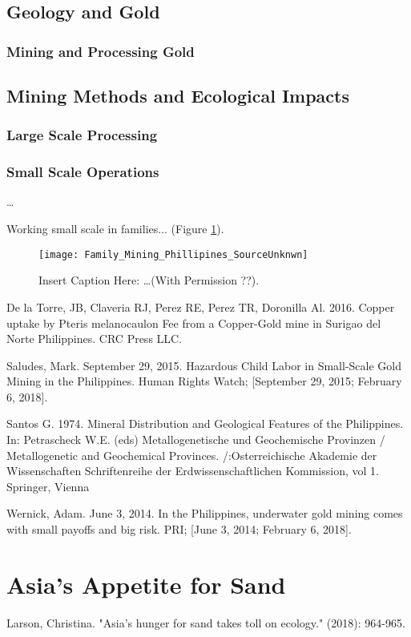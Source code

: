 \subsection{Geology and Gold}

\subsubsection{Mining and Processing Gold}

\subsection{Mining Methods and Ecological Impacts}

\subsubsection{Large Scale Processing}

\subsubsection{Small Scale Operations}

\citet{drasch2001mt} \ldots

Working small scale in families... (Figure \ref{fig:famliymining}).

\begin{figure}[!ht]
\texttt{[image: Family\_Mining\_Phillipines\_SourceUnknwn]}

\caption{Insert Caption Here: \ldots (With Permission ??).}
\label{fig:famliymining}
\end{figure}

\citep{de2016copper}

De la Torre, JB, Claveria RJ, Perez RE, Perez TR, Doronilla Al. 2016. Copper uptake by Pteris melanocaulon Fee from a Copper-Gold mine in Surigao del Norte Philippines. CRC Press LLC. 

Saludes, Mark. September 29, 2015. Hazardous Child Labor in Small-Scale Gold Mining in the Philippines. Human Rights Watch; [September 29, 2015; February 6, 2018].

\citet{santos1974mineral}

Santos G. 1974. Mineral Distribution and Geological Features of the Philippines. In: Petrascheck W.E. (eds) Metallogenetische und Geochemische Provinzen / Metallogenetic and Geochemical Provinces. /:Osterreichische Akademie der Wissenschaften Schriftenreihe der Erdwissenschaftlichen Kommission, vol 1. Springer, Vienna

Wernick, Adam. June 3, 2014. In the Philippines, underwater gold mining comes with small payoffs and big risk. PRI; [June 3, 2014; February 6, 2018]. 

\citet{drasch2001mt}

\section{Asia's Appetite for Sand}

Larson, Christina. "Asia's hunger for sand takes toll on ecology." (2018): 964-965.


%

